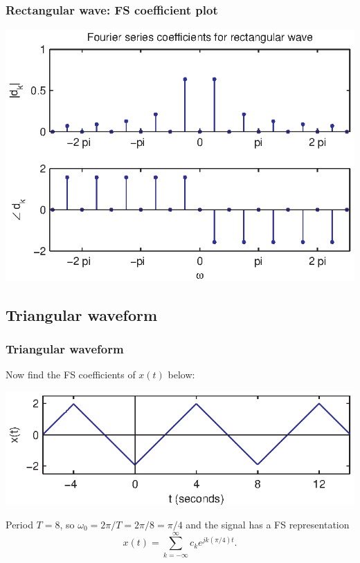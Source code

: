 \documentclass[10pt]{beamer}
\begin{document}
\begin{frame}
\frametitle{Rectangular wave:  FS coefficient plot}

\begin{center}
  \includegraphics{fs_add_fig05}
\end{center}
\end{frame}

\begin{frame}
\subsection{Triangular waveform}
\frametitle<presentation>{Triangular waveform}

Now find the FS coefficients of $x(t)$ below:
\begin{center}
  \includegraphics{fs_add_fig01}
\end{center}
Period $T=8$, so $\omega_0 = 2\pi/T = 2\pi/8 = \pi/4$ and the signal has a FS 
representation 
\begin{equation*}
  x(t) = \sum_{k=-\infty}^\infty c_k e^{j k (\pi/4) t}.
\end{equation*}
\end{frame}
\end{document}
